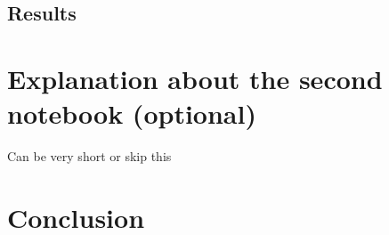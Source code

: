 \documentclass[12pt]{article}
\begin{document}
\subsection{Results}

\newpage
\section{Explanation about the second notebook (optional)}
Can be very short or skip this
\section{Conclusion}
\end{document}
